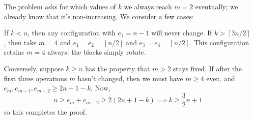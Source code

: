 The problem asks for which values of $k$ we always reach $m=2$ eventually;
we already know that it's non-increasing.
We consider a few cases:
\begin{itemize}
  \ii If $k < n$, then any configuration with $e_1 = n-1$ will never change.
  \ii If $k > \left\lceil 3n/2 \right\rceil$,
  then take $m=4$ and $e_1 = e_2 = \left\lfloor n/2 \right\rfloor$
  and $e_3 = e_4 = \left\lceil n/2 \right\rceil$.
  This configuration retains $m=4$ always:
  the blocks simply rotate.

  \ii Conversely, suppose $k \ge n$ has the property that $m > 2$ stays fixed.
  If after the first three operations $m$ hasn't changed,
  then we must have $m \ge 4$ even, and $e_m, e_{m-1}, e_{m-2} \ge 2n+1 - k$.
  Now,
  \[ n \ge e_m + e_{m-2} \ge 2(2n+1-k) \implies k \ge \frac 32 n + 1 \]
  so this completes the proof.
\end{itemize}
\pagebreak
